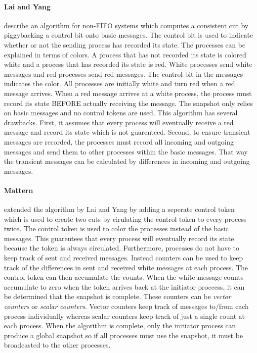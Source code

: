 \documentclass[11pt]{book}
\begin{document}
\paragraph{Lai and Yang}\cite{lai-87} describe an algorithm for non-FIFO systems which
computes a consistent cut by piggybacking a control bit onto basic messages. The control
bit is used to indicate whether or not the sending process has recorded its state. The
processes can be explained in terms of colors. A process that has not recorded its state
is colored white and a process that has recorded its state is red. White processes send
white messages and red processes send red messages. The control bit in the messages indicates
the color. All processes are initially white and turn red when a red message arrives. When
a red message arrives at a white process, the process must record its state BEFORE actually
receiving the message. The snapshot only relies on basic messages and no control tokens are
used. This algorithm has several drawbacks. First, it assumes that every process will
eventually receive a red message and record its state which is not guarenteed. Second, to
ensure transient messages are recorded, the processes must record all incoming and outgoing
messages and send them to other processes within the basic messages. That way the transient
messages can be calculated by differences in incoming and outgoing messages.

\paragraph{Mattern}\cite{mattern-93} extended the algorithm by Lai and Yang by adding a
seperate control token which is used to create two cuts by cirulating the control token to
every process twice. The control token is used to color the processes instead of the basic
messages. This guarentees that every process will eventually record its state because the
token is always circulated. Furthermore, processes do not have to keep track of sent and
received messages. Instead counters can be used to keep track of the differences in sent
and received white messages at each process. The control token can then accumulate the
counts. When the white message counts accumulate to zero when the token arrives back at
the initiator proccess, it can be determined that the snapshot is complete. These counters
can be \emph{vector counters} or \emph{scalar counters}. Vector counters keep track of
messages to/from each process individually whereas scalar counters keep track of just a
single count at each process. When the algorithm is complete, only the initiator process
can produce a global snapshot so if all processes must use the snapshot, it must be broadcasted
to the other processes.
\end{document}
